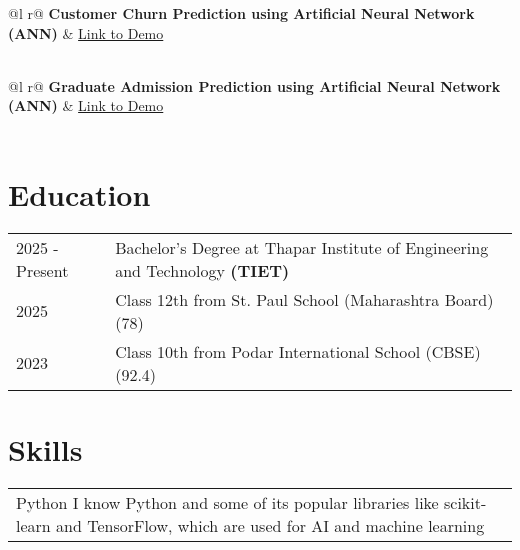 \documentclass[a4paper,12pt]{article}
\begin{document}
\begin{tabularx}{\linewidth}{ @{}l r@{} }
\textbf{Customer Churn Prediction using Artificial Neural Network (ANN)} & \hfill \href{https://github.com/LakshThakre/DeepLearning}{Link to Demo} \\[3.75pt]
  \\
\end{tabularx}

\begin{tabularx}{\linewidth}{ @{}l r@{} }
\textbf{Graduate Admission Prediction using Artificial Neural Network (ANN)} & \hfill \href{https://github.com/LakshThakre/DeepLearning}{Link to Demo} \\[3.75pt]
  \\
\end{tabularx}

\section{Education}
\begin{tabularx}{\linewidth}{@{}l X@{}}
2025 - Present & Bachelor's Degree at Thapar Institute of Engineering and Technology \textbf{(TIET)}\\ 

2025 & Class 12th from St. Paul School (Maharashtra Board) \hfill  (78) \\

2023 & Class 10th from Podar International School (CBSE) \hfill  (92.4) \\
\end{tabularx}

\section{Skills}
\begin{tabularx}{\linewidth}{@{}l X@{}}
Python \normalsize{I know Python and some of its popular libraries like scikit-learn and TensorFlow, which are used for AI and machine learning}\\
\end{tabularx}

\vfill
{}
\end{document}
